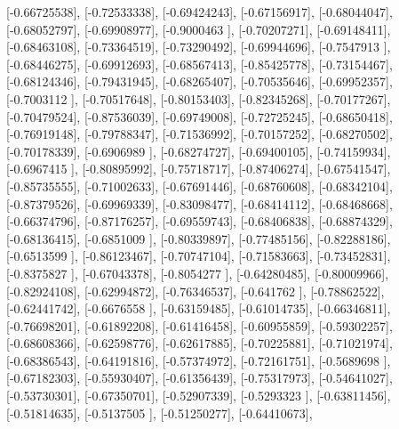 \documentclass{article}
\begin{document}
       [-0.66725538],
       [-0.72533338],
       [-0.69424243],
       [-0.67156917],
       [-0.68044047],
       [-0.68052797],
       [-0.69908977],
       [-0.9000463 ],
       [-0.70207271],
       [-0.69148411],
       [-0.68463108],
       [-0.73364519],
       [-0.73290492],
       [-0.69944696],
       [-0.7547913 ],
       [-0.68446275],
       [-0.69912693],
       [-0.68567413],
       [-0.85425778],
       [-0.73154467],
       [-0.68124346],
       [-0.79431945],
       [-0.68265407],
       [-0.70535646],
       [-0.69952357],
       [-0.7003112 ],
       [-0.70517648],
       [-0.80153403],
       [-0.82345268],
       [-0.70177267],
       [-0.70479524],
       [-0.87536039],
       [-0.69749008],
       [-0.72725245],
       [-0.68650418],
       [-0.76919148],
       [-0.79788347],
       [-0.71536992],
       [-0.70157252],
       [-0.68270502],
       [-0.70178339],
       [-0.6906989 ],
       [-0.68274727],
       [-0.69400105],
       [-0.74159934],
       [-0.6967415 ],
       [-0.80895992],
       [-0.75718717],
       [-0.87406274],
       [-0.67541547],
       [-0.85735555],
       [-0.71002633],
       [-0.67691446],
       [-0.68760608],
       [-0.68342104],
       [-0.87379526],
       [-0.69969339],
       [-0.83098477],
       [-0.68414112],
       [-0.68468668],
       [-0.66374796],
       [-0.87176257],
       [-0.69559743],
       [-0.68406838],
       [-0.68874329],
       [-0.68136415],
       [-0.6851009 ],
       [-0.80339897],
       [-0.77485156],
       [-0.82288186],
       [-0.6513599 ],
       [-0.86123467],
       [-0.70747104],
       [-0.71583663],
       [-0.73452831],
       [-0.8375827 ],
       [-0.67043378],
       [-0.8054277 ],
       [-0.64280485],
       [-0.80009966],
       [-0.82924108],
       [-0.62994872],
       [-0.76346537],
       [-0.641762  ],
       [-0.78862522],
       [-0.62441742],
       [-0.6676558 ],
       [-0.63159485],
       [-0.61014735],
       [-0.66346811],
       [-0.76698201],
       [-0.61892208],
       [-0.61416458],
       [-0.60955859],
       [-0.59302257],
       [-0.68608366],
       [-0.62598776],
       [-0.62617885],
       [-0.70225881],
       [-0.71021974],
       [-0.68386543],
       [-0.64191816],
       [-0.57374972],
       [-0.72161751],
       [-0.5689698 ],
       [-0.67182303],
       [-0.55930407],
       [-0.61356439],
       [-0.75317973],
       [-0.54641027],
       [-0.53730301],
       [-0.67350701],
       [-0.52907339],
       [-0.5293323 ],
       [-0.63811456],
       [-0.51814635],
       [-0.5137505 ],
       [-0.51250277],
       [-0.64410673],
\end{document}
